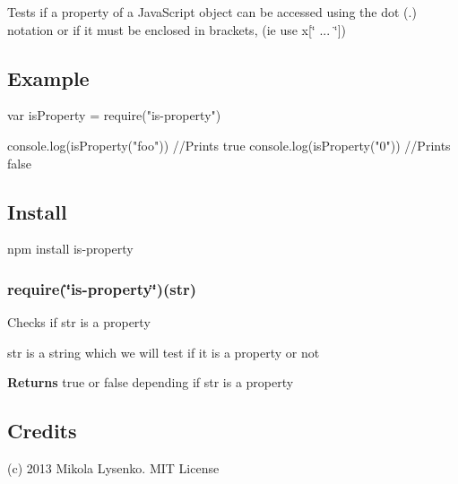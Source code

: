 Tests if a property of a Java\+Script object can be accessed using the dot (.) notation or if it must be enclosed in brackets, (ie use x\mbox{[}\char`\"{} ... \char`\"{}\mbox{]})

\subsection*{Example }


\begin{DoxyCode}
var isProperty = require("is-property")

console.log(isProperty("foo"))  //Prints true
console.log(isProperty("0"))    //Prints false
\end{DoxyCode}


\subsection*{Install }

\begin{DoxyVerb}npm install is-property
\end{DoxyVerb}


\subsubsection*{{\ttfamily require(\char`\"{}is-\/property\char`\"{})(str)}}

Checks if str is a property


\begin{DoxyItemize}
\item {\ttfamily str} is a string which we will test if it is a property or not
\end{DoxyItemize}

{\bfseries Returns} true or false depending if str is a property

\subsection*{Credits}

(c) 2013 Mikola Lysenko. M\+IT License 